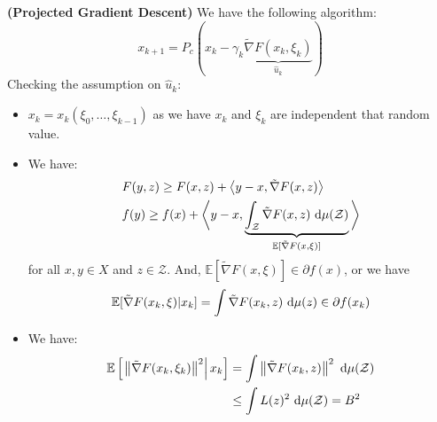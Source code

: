 \begin{definition}{\textbf{(Projected Gradient Descent)}}
    We have the following algorithm:
    \begin{equation*}
        x_{k+1} = P_c(x_k - \gamma_k\underbrace{\tilde{\nabla}F(x_k,\xi_k)}_{\hat{u}_k})
    \end{equation*}
    Checking the assumption on $\hat{u}_k$:
    \begin{itemize}
        \item $x_k = x_k(\xi_0, \dots, \xi_{k-1})$ as we have $x_k$ and $\xi_k$ are independent that random value.
        \item We have: 
        \begin{equation*}
        \begin{aligned}
            &F(y, z) \ge F(x, z) + \left\langle y-x, \tilde{\nabla}F(x, z) \right\rangle \\
            &f(y)\ge f(x) + \bigg\langle y-x, \underbrace{\int_\mathcal{Z}\tilde{\nabla}F(x, z)\ \mathrm{d} \mu(\mathcal{Z})}_{\mathbb{E}[\tilde{\nabla}F(x, \xi)]}\bigg\rangle
        \end{aligned}
        \end{equation*}
        for all $x, y \in X$ and $z\in \mathcal{Z}$. And, $\mathbb{E}[\tilde{\nabla}F(x, \xi)] \in \partial f(x)$, or we have 
        \begin{equation*}
            \mathbb{E}[\tilde{\nabla} F(x_k, \xi) | x_k] = \int \tilde{\nabla}F(x_k, z)\ \mathrm{d}\mu(z) \in \partial f(x_k)
        \end{equation*}
        \item We have:
        \begin{equation*}
        \begin{aligned}
            \mathbb{E}\left[ \left.\left\lVert\tilde{\nabla}F(x_k, \xi_k)\right\rVert^2 \right| x_k \right] &= \int \left\lVert\tilde{\nabla}F(x_k, z)\right\rVert^2 \ \mathrm{d} \mu(\mathcal{Z}) \\
            &\le \int L(z)^2\ \mathrm{d}\mu(\mathcal{Z}) = B^2
        \end{aligned}
        \end{equation*}
    \end{itemize}
\end{definition}

